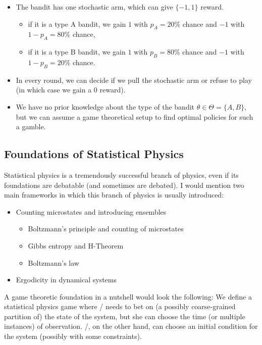 \documentclass{article}
\theoremstyle{definition}
\begin{document}
\begin{itemize}
    \item The bandit has one stochastic arm, which can give $\{-1,1\}$ reward.
    \begin{itemize}
        \item if it is a type A bandit, we gain $1$ with $p_A = 20\%$ chance and $-1$ with $1-p_A=80\%$ chance,
        \item if it is a type B bandit, we gain $1$ with $p_B=80\%$ chance and $-1$ with $1-p_B=20\%$ chance.
    \end{itemize}
    \item In every round, we can decide if we pull the stochastic arm or refuse to play (in which case we gain a $0$ reward).
    \item We have no prior knowledge about the type of the bandit $\theta \in \Theta = \{A, B\}$, but we can assume a game theoretical setup to find optimal policies for such a gamble.
\end{itemize}

\subsection{Foundations of Statistical Physics}

Statistical physics is a tremendously successful branch of physics, even if its foundations are debatable (and sometimes are debated).
I would mention two main frameworks in which this branch of physics is usually introduced:

\begin{itemize}
    \item Counting microstates and introducing ensembles
    \begin{itemize}
        \item Boltzmann's principle and counting of microstates \cite{book:Greiner,book:PathriaStatisticalMechanics,book:StatisticalPhysicsBerkeley,book:Sommerfeld}
        \item Gibbs entropy and H-Theorem \cite{book:WeinbergModernPhysics}
        \item Boltzmann’s law \cite{book:Feynman,book:FeynmanStatisticalMechanics}
    \end{itemize}
    \item Ergodicity in dynamical systems \cite{book:Krylov, book:ErgodicTheory, book:Landau}
\end{itemize}

A game theoretic foundation in a nutshell would look the following:
We define a statistical physics game where \PI/ needs to bet on (a possibly coarse-grained partition of) the state of the system, but she can choose the time (or multiple instances) of observation.
\PII/, on the other hand, can choose an initial condition for the system (possibly with some constraints).
\end{document}
